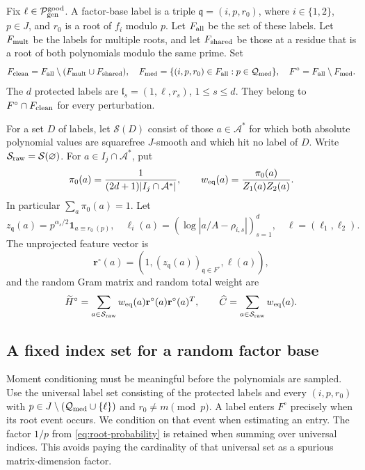 Fix \(\ell\in\mathcal P_{\rm gen}^{\rm good}\).  A factor-base label
is a triple \(\mathfrak q=(i,p,r_0)\), where \(i\in\{1,2\}\),
\(p\in J\), and \(r_0\) is a root of \(f_i\) modulo \(p\).
Let \(F_{\rm all}\) be the set of these labels.  Let
\(F_{\rm mult}\) be the labels for multiple roots, and let
\(F_{\rm shared}\) be those at a residue that is a root of both
polynomials modulo the same prime.  Set
\[
 F_{\rm clean}=F_{\rm all}\setminus(F_{\rm mult}\cup F_{\rm shared}),
 \quad
 F_{\rm med}=\{(i,p,r_0)\in F_{\rm all}:p\in\mathcal Q_{\rm med}\},
 \quad F^\circ=F_{\rm all}\setminus F_{\rm med}.
\]
The \(d\) protected labels are
\(\mathfrak l_s=(1,\ell,r_s)\), \(1\le s\le d\).  They belong
to \(F^\circ\cap F_{\rm clean}\) for every perturbation.

For a set \(D\) of labels, let \(\mathcal S(D)\) consist of those
\(a\in\mathcal A^*\) for which both absolute polynomial values are
squarefree \(J\)-smooth and which hit no label of \(D\).
Write \(\mathcal S_{\rm raw}=\mathcal S(\varnothing)\).
For \(a\in I_j\cap\mathcal A^*\), put
\begin{equation}\label{eq:weights}
 \pi_0(a)=\frac1{(2d+1)|I_j\cap\mathcal A^*|},\qquad
 w_{\rm eq}(a)=\frac{\pi_0(a)}{Z_1(a)Z_2(a)}.
\end{equation}
In particular \(\sum_a\pi_0(a)=1\).
Let
\[
 z_{\mathfrak q}(a)=p^{\alpha_s/2}\mathbf1_{a\equiv r_0\ (p)},
 \quad
 \boldsymbol\ell_i(a)=
       (\log|a/A-\rho_{i,s}|)_{s=1}^d,
 \quad \boldsymbol\ell=(\boldsymbol\ell_1,\boldsymbol\ell_2).
\]
The unprojected feature vector is
\[
 \mathbf r^\circ(a)=
   (1,(z_{\mathfrak q}(a))_{\mathfrak q\in F^\circ},
                  \boldsymbol\ell(a)),
\]
and the random Gram matrix and random total weight are
\[
 \widetilde H^\circ=
      \sum_{a\in\mathcal S_{\rm raw}}
           w_{\rm eq}(a)\mathbf r^\circ(a)\mathbf r^\circ(a)^T,
 \qquad
 \widehat C=\sum_{a\in\mathcal S_{\rm raw}}w_{\rm eq}(a).
\]

\subsection{A fixed index set for a random factor base}

Moment conditioning must be meaningful before the polynomials are
sampled.  Use the universal label set consisting of the protected
labels and every \((i,p,r_0)\) with
\(p\in J\setminus(\mathcal Q_{\rm med}\cup\{\ell\})\) and
\(r_0\ne m\pmod p\).  A label enters \(F^\circ\) precisely when
its root event occurs.  We condition on that event when estimating
an entry.  The factor \(1/p\) from
\eqref{eq:root-probability} is retained when summing over universal
indices.  This avoids paying the cardinality of that universal set
as a spurious matrix-dimension factor.

